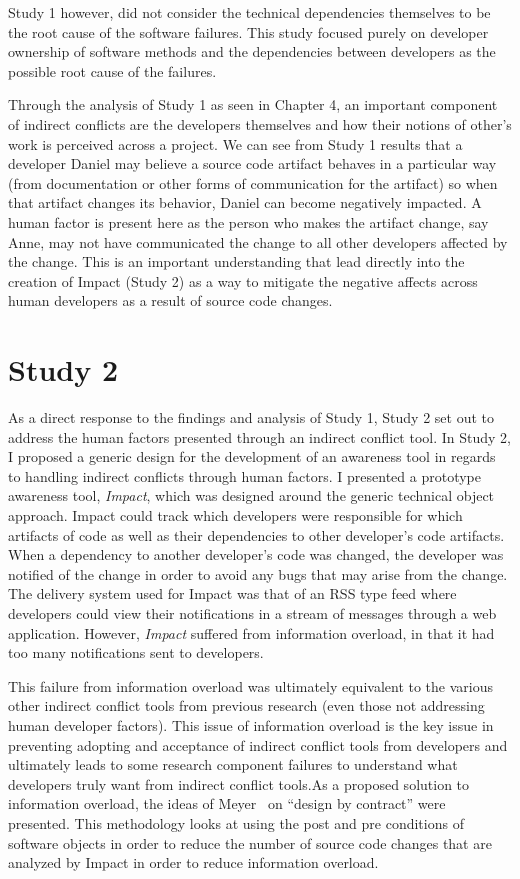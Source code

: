 Study 1 however, did not consider the technical dependencies themselves to be the root cause of
the software failures. This study focused purely on developer ownership of software methods and
the dependencies between developers as the possible root cause of the failures.

Through the analysis of Study 1 as seen in Chapter 4, an important component of indirect conflicts are the developers
themselves and how their notions of other's work is perceived across a project. We can see from Study 1 results that
a developer Daniel may believe a source code artifact behaves in a particular way (from documentation or other forms
of communication for the artifact) so when that artifact changes its behavior, Daniel can become negatively impacted.
A human factor is present here as the person who makes the artifact change, say Anne, may not have communicated the
change to all other developers affected by the change. This is an important understanding that lead directly into the
creation of Impact (Study 2) as a way to mitigate the negative affects across human developers as a result of 
source code changes.

\section{Study 2}

As a direct response to the findings and analysis of Study 1, Study 2 set out to address the human factors presented
through an indirect conflict tool. In Study 2, I proposed a generic design for the development of an awareness tool 
in regards to handling indirect conflicts through human factors. I presented a prototype awareness tool, \textit{Impact}, 
which was designed around the generic technical object approach. Impact could track which developers were responsible
for which artifacts of code as well as their dependencies to other developer's code artifacts. When a dependency to
another developer's code was changed, the developer was notified of the change in order to avoid any bugs that
may arise from the change. The delivery system used for Impact was that of an RSS type feed where developers could view
their notifications in a stream of messages through a web application. However, \textit{Impact} suffered from information 
overload, in that it had too many notifications sent to developers.

This failure from information overload was ultimately equivalent to the various other indirect conflict tools from
previous research (even those not addressing human developer factors). This issue of information overload is the key issue 
in preventing adopting and acceptance of indirect conflict tools from developers and ultimately leads to some research
component failures to understand what developers truly want from indirect conflict tools.As a proposed solution to information overload, 
the ideas of Meyer~\cite{Meyer:1988} on ``design by contract'' were presented. This methodology looks at using the 
post and pre conditions of software objects in order to reduce the number of source code changes that are analyzed by 
Impact in order to reduce information overload.

